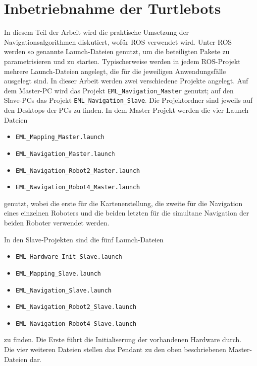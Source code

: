 \section{Inbetriebnahme der Turtlebots}
In diesem Teil der Arbeit wird die praktische Umsetzung der Navigationsalgorithmen diskutiert, wofür ROS verwendet wird. Unter ROS werden so genannte Launch-Dateien genutzt, um die beteiligten Pakete zu parametrisieren und zu starten. Typischerweise werden in jedem ROS-Projekt mehrere Launch-Dateien angelegt, die für die jeweiligen Anwendungsfälle ausgelegt sind. In dieser Arbeit werden zwei verschiedene Projekte angelegt. Auf dem Master-PC wird das Projekt \lstinline{EML_Navigation_Master}{} genutzt; auf den Slave-PCs das Projekt \lstinline{EML_Navigation_Slave}{}. Die Projektordner sind jeweils auf den Desktops der PCs zu finden. In dem Master-Projekt werden die vier Launch-Dateien
\begin{itemize}
\item \lstinline{EML_Mapping_Master.launch}{}
\item \lstinline{EML_Navigation_Master.launch}{}
\item \lstinline{EML_Navigation_Robot2_Master.launch}{}
\item \lstinline{EML_Navigation_Robot4_Master.launch}{}
\end{itemize}
genutzt, wobei die erste für die Kartenerstellung, die zweite für die Navigation eines einzelnen Roboters und die beiden letzten für die simultane Navigation der beiden Roboter verwendet werden.

In den Slave-Projekten sind die fünf Launch-Dateien
\begin{itemize}
\item \lstinline{EML_Hardware_Init_Slave.launch}{}
\item \lstinline{EML_Mapping_Slave.launch}{}
\item \lstinline{EML_Navigation_Slave.launch}{}
\item \lstinline{EML_Navigation_Robot2_Slave.launch}{}
\item \lstinline{EML_Navigation_Robot4_Slave.launch}{}
\end{itemize}
zu finden. Die Erste führt die Initialiserung der vorhandenen Hardware durch. Die vier weiteren Dateien stellen das Pendant zu den oben beschriebenen Master-Dateien dar.

\newpage

